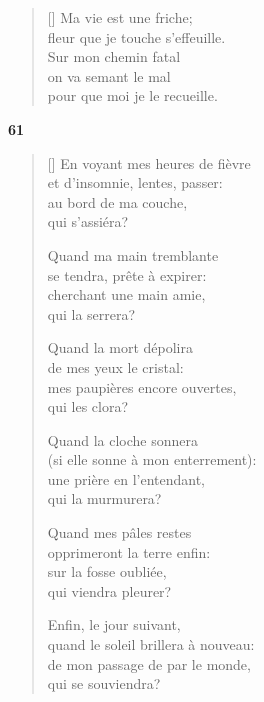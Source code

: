 \documentclass[a4paper,12pt]{book}
\begin{document}
\begin{verse}[\versewidth]
  Ma vie est une friche; \\
  fleur que je touche s'effeuille. \\
  Sur mon chemin fatal \\
  on va semant le mal \\
  pour que moi je le recueille.
\end{verse}

\bigskip

\begin{center}
  \textbf{61}
\end{center}

\settowidth{\versewidth}{quand le soleil brillera à nouveau:}

\begin{verse}[\versewidth]
  En voyant mes heures de fièvre \\
  et d'insomnie, lentes, passer: \\
  au bord de ma couche, \\
  qui s'assiéra?

  Quand ma main tremblante \\
  se tendra, prête à expirer: \\
  cherchant une main amie, \\
  qui la serrera?

  Quand la mort dépolira \\
  de mes yeux le cristal: \\
  mes paupières encore ouvertes, \\
  qui les clora?

  Quand la cloche sonnera \\
  (si elle sonne à mon enterrement): \\
  une prière en l'entendant, \\
  qui la murmurera?

  Quand mes pâles restes \\
  opprimeront la terre enfin: \\
  sur la fosse oubliée, \\
  qui viendra pleurer?

  Enfin, le jour suivant, \\
  quand le soleil brillera à nouveau: \\
  de mon passage de par le monde, \\
  qui se souviendra?
\end{verse}
\end{document}

